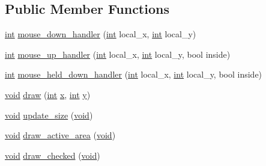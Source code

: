 \subsection*{Public Member Functions}
\begin{DoxyCompactItemize}
\item 
\hyperlink{wglext_8h_a500a82aecba06f4550f6849b8099ca21}{int} \hyperlink{class_g_l_u_i___radio_button_a1043d967fe810f9b71b80d17152b977a}{mouse\+\_\+down\+\_\+handler} (\hyperlink{wglext_8h_a500a82aecba06f4550f6849b8099ca21}{int} local\+\_\+x, \hyperlink{wglext_8h_a500a82aecba06f4550f6849b8099ca21}{int} local\+\_\+y)
\item 
\hyperlink{wglext_8h_a500a82aecba06f4550f6849b8099ca21}{int} \hyperlink{class_g_l_u_i___radio_button_a2d6e08dc0802146227e8cd4f4d5ef571}{mouse\+\_\+up\+\_\+handler} (\hyperlink{wglext_8h_a500a82aecba06f4550f6849b8099ca21}{int} local\+\_\+x, \hyperlink{wglext_8h_a500a82aecba06f4550f6849b8099ca21}{int} local\+\_\+y, bool inside)
\item 
\hyperlink{wglext_8h_a500a82aecba06f4550f6849b8099ca21}{int} \hyperlink{class_g_l_u_i___radio_button_a7a5c7c04144139201848320c31f92844}{mouse\+\_\+held\+\_\+down\+\_\+handler} (\hyperlink{wglext_8h_a500a82aecba06f4550f6849b8099ca21}{int} local\+\_\+x, \hyperlink{wglext_8h_a500a82aecba06f4550f6849b8099ca21}{int} local\+\_\+y, bool inside)
\item 
\hyperlink{wglext_8h_a9e6b7f1933461ef318bb000d6bd13b83}{void} \hyperlink{class_g_l_u_i___radio_button_a21f6925f484831394a09e6f44dc8d11e}{draw} (\hyperlink{wglext_8h_a500a82aecba06f4550f6849b8099ca21}{int} \hyperlink{glext_8h_ad77deca22f617d3f0e0eb786445689fc}{x}, \hyperlink{wglext_8h_a500a82aecba06f4550f6849b8099ca21}{int} \hyperlink{glext_8h_a9298c7ad619074f5285b32c6b72bfdea}{y})
\item 
\hyperlink{wglext_8h_a9e6b7f1933461ef318bb000d6bd13b83}{void} \hyperlink{class_g_l_u_i___radio_button_a18a5fd5c61bc61231df01972f85b464b}{update\+\_\+size} (\hyperlink{wglext_8h_a9e6b7f1933461ef318bb000d6bd13b83}{void})
\item 
\hyperlink{wglext_8h_a9e6b7f1933461ef318bb000d6bd13b83}{void} \hyperlink{class_g_l_u_i___radio_button_a0000fc6e9668323092c2acc0852851fb}{draw\+\_\+active\+\_\+area} (\hyperlink{wglext_8h_a9e6b7f1933461ef318bb000d6bd13b83}{void})
\item 
\hyperlink{wglext_8h_a9e6b7f1933461ef318bb000d6bd13b83}{void} \hyperlink{class_g_l_u_i___radio_button_a7877448ee5aeb07b26e045d9d4a5c23b}{draw\+\_\+checked} (\hyperlink{wglext_8h_a9e6b7f1933461ef318bb000d6bd13b83}{void})

\end{DoxyCompactItemize}

